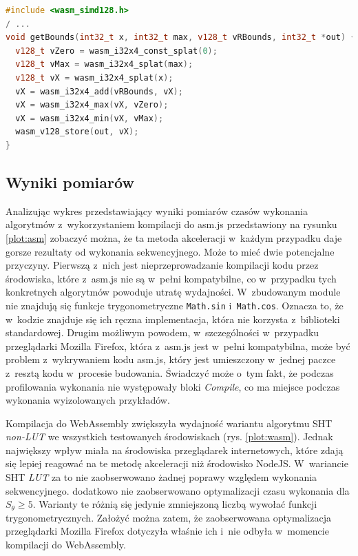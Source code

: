 \begin{lstlisting}[language=C++, float=ht, label=lst:simd, caption=Funkcja \lstinline{getBounds} algorytmu CHT z~wykorzystaniem instrukcji SIMD.]
#include <wasm_simd128.h>
/ ...
void getBounds(int32_t x, int32_t max, v128_t vRBounds, int32_t *out) {
  v128_t vZero = wasm_i32x4_const_splat(0);
  v128_t vMax = wasm_i32x4_splat(max);
  v128_t vX = wasm_i32x4_splat(x);
  vX = wasm_i32x4_add(vRBounds, vX);
  vX = wasm_i32x4_max(vX, vZero);
  vX = wasm_i32x4_min(vX, vMax);
  wasm_v128_store(out, vX);
}
\end{lstlisting}

\subsection{Wyniki pomiarów}

Analizując wykres przedstawiający wyniki pomiarów czasów wykonania algorytmów z~wykorzystaniem kompilacji do asm.js przedstawiony na rysunku \ref{plot:asm} zobaczyć można, że ta metoda akceleracji w~każdym przypadku daje gorsze rezultaty od wykonania sekwencyjnego. Może to mieć dwie potencjalne przyczyny. Pierwszą z~nich jest nieprzeprowadzanie kompilacji kodu przez środowiska, które z~asm.js nie są w~pełni kompatybilne, co w~przypadku tych konkretnych algorytmów powoduje utratę wydajności. W~zbudowanym module nie znajdują się funkcje trygonometryczne \lstinline{Math.sin} i~\lstinline{Math.cos}. Oznacza to, że w~kodzie znajduje się ich ręczna implementacja, która nie korzysta z~biblioteki standardowej. Drugim możliwym powodem, w~szczególności w~przypadku przeglądarki Mozilla Firefox, która z~asm.js jest w~pełni kompatybilna, może być problem z~wykrywaniem kodu asm.js, który jest umieszczony w~jednej paczce z~resztą kodu w~procesie budowania. Świadczyć może o~tym fakt, że podczas profilowania wykonania nie występowały bloki \textit{Compile}, co ma miejsce podczas wykonania wyizolowanych przykładów.







Kompilacja do WebAssembly zwiększyła wydajność wariantu algorytmu SHT \textit{non-LUT} we wszystkich testowanych środowiskach (rys. \ref{plot:wasm}). Jednak największy wpływ miała na środowiska przeglądarek internetowych, które zdają się lepiej reagować na te metodę akceleracji niż środowisko NodeJS. W~wariancie SHT \textit{LUT} za to nie zaobserwowano żadnej poprawy względem wykonania sekwencyjnego. dodatkowo nie zaobserwowano optymalizacji czasu wykonania dla $S_\theta \geq 5$. Warianty te różnią się jedynie zmniejszoną liczbą wywołać funkcji trygonometrycznych. Założyć można zatem, że zaobserwowana optymalizacja przeglądarki Mozilla Firefox dotyczyła właśnie ich i~nie odbyła w~momencie kompilacji do WebAssembly. 

